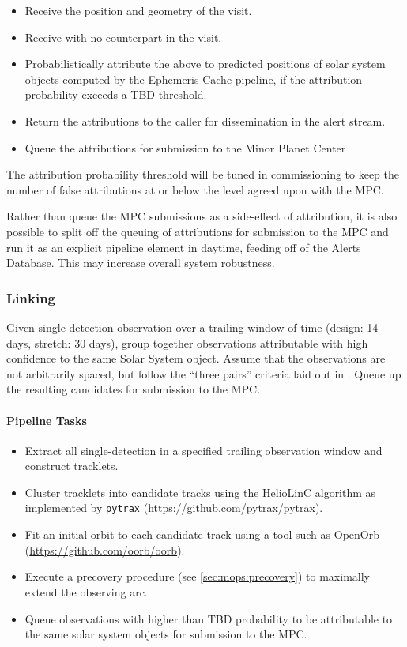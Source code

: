 \begin{itemize}
	\item Receive the position and geometry of the visit.
	\item Receive \DIASources with no \DIAObject counterpart in the visit.
	\item Probabilistically attribute the \DIASources above to predicted positions of solar system objects computed by the Ephemeris Cache pipeline, if the attribution probability exceeds a TBD threshold.
	\item Return the attributions to the caller for dissemination in the alert stream.
	\item Queue the attributions for submission to the Minor Planet Center
\end{itemize}

The attribution probability threshold will be tuned in commissioning to keep the number of false attributions at or below the level agreed upon with the MPC.

Rather than queue the MPC submissions as a side-effect of attribution, it is also possible to split off the queuing of attributions for submission to the MPC and run it as an explicit pipeline element in daytime, feeding off of the Alerts Database. This may increase overall system robustness.

\subsubsection{Linking}

Given single-detection observation over a trailing window of time (design: 14 days, stretch: 30 days), group together observations attributable with high confidence to the same Solar System object. Assume that the observations are not arbitrarily spaced, but follow the ``three pairs'' criteria laid out in \OSS\@ {}. Queue up the resulting candidates for submission to the MPC.

\paragraph{Pipeline Tasks}

\begin{itemize}
\item Extract all single-detection \DIAObjects in a specified trailing observation window and construct tracklets.
\item Cluster tracklets into candidate tracks using the HelioLinC algorithm as implemented by {\tt pytrax} (\url{https://github.com/pytrax/pytrax}).
\item Fit an initial orbit to each candidate track using a tool such as OpenOrb (\url{https://github.com/oorb/oorb}).
\item Execute a precovery procedure (see \ref{sec:mops:precovery}) to maximally extend the observing arc.
\item Queue observations with higher than TBD probability to be attributable to the same solar system objects for submission to the MPC.
\end{itemize}



